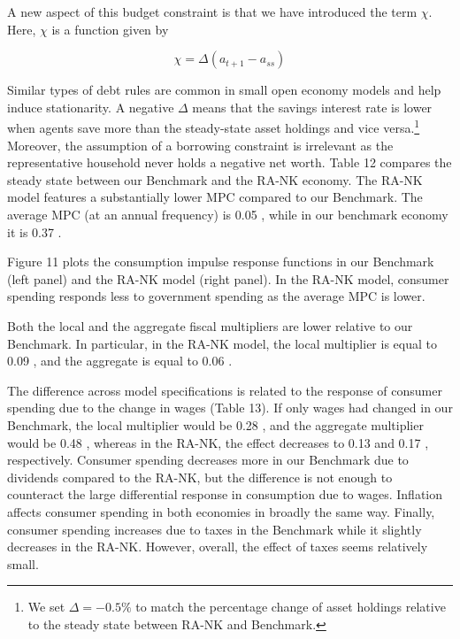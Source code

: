 \documentclass[\latexroot/\projectname]{subfiles}
\begin{document}
A new aspect of this budget constraint is that we have introduced the term $\chi$. Here, $\chi$ is a function given by

$$
\chi=\Delta\left(a_{t+1}-a_{s s}\right)
$$

Similar types of debt rules are common in small open economy models and help induce stationarity. A negative $\Delta$ means that the savings interest rate is lower when agents save more than the steady-state asset holdings and vice versa.\footnote{We set $\Delta=-0.5\%$ to match the percentage change of asset holdings relative to the steady state between RA-NK and Benchmark.} Moreover, the assumption of a borrowing constraint is irrelevant as the representative household never holds a negative net worth. Table 12 compares the steady state between our Benchmark and the RA-NK economy. The RA-NK model features a substantially lower MPC compared to our Benchmark. The average MPC (at an annual frequency) is 0.05 , while in our benchmark economy it is 0.37 .

Figure 11 plots the consumption impulse response functions in our Benchmark (left panel) and the RA-NK model (right panel). In the RA-NK model, consumer spending responds less to government spending as the average MPC is lower.







Both the local and the aggregate fiscal multipliers are lower relative to our Benchmark. In particular, in the RA-NK model, the local multiplier is equal to 0.09 , and the aggregate is equal to 0.06 .

The difference across model specifications is related to the response of consumer spending due to the change in wages (Table 13). If only wages had changed in our Benchmark, the local multiplier would be 0.28 , and the aggregate multiplier would be 0.48 , whereas in the RA-NK, the effect decreases to 0.13 and 0.17 , respectively. Consumer spending decreases more in our Benchmark due to dividends compared to the RA-NK, but the difference is not enough to counteract the large differential response in consumption due to wages. Inflation affects consumer spending in both economies in broadly the same way. Finally, consumer spending increases due to taxes in the Benchmark while it slightly decreases in the RA-NK. However, overall, the effect of taxes seems relatively small.
\end{document}
